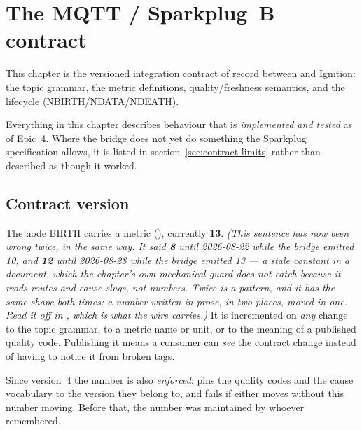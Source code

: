 \chapter{The MQTT / Sparkplug~B contract}
\label{ch:contract}

This chapter is the versioned integration contract of record between \prog and Ignition:
the topic grammar, the metric definitions, quality/freshness semantics, and the
lifecycle (NBIRTH/NDATA/NDEATH).

\begin{note}
Everything in this chapter describes behaviour that is \emph{implemented and tested} as of
Epic~4. Where the bridge does not yet do something the Sparkplug specification allows, it
is listed in section~\ref{sec:contract-limits} rather than described as though it worked.
\end{note}

\section{Contract version}

The node BIRTH carries a metric  (), currently
\textbf{13}. \emph{(This sentence has now been wrong twice, in the same way. It said \textbf{8}
until 2026-08-22 while the bridge emitted 10, and \textbf{12} until 2026-08-28 while the bridge
emitted 13 --- a stale constant in a document, which the chapter's own mechanical guard does not
catch because it reads routes and cause slugs, not numbers. Twice is a pattern, and it has the same
shape both times: a number written in prose, in two places, moved in one. Read it off
 in , which is what the wire carries.)} It is incremented on \emph{any} change to the topic grammar, to a metric name or
unit, or to the meaning of a published quality code. Publishing it means a consumer can
\emph{see} the contract change instead of having to notice it from broken tags.

Since version~4 the number is also \emph{enforced}:  pins the
quality codes and the cause vocabulary to the version they belong to, and fails if either
moves without this number moving. Before that, the number was maintained by whoever
remembered.

